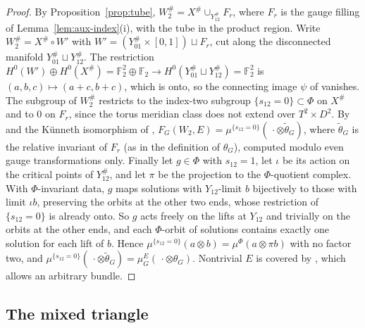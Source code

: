 \documentclass[11pt]{amsart}
\theoremstyle{definition}
\theoremstyle{remark}
\theoremstyle{plain}
\numberwithin{equation}{section}
\newcommand{\FF}{\mathbb{F}_2}
\begin{document}
\begin{proof}
By Proposition~\ref{prop:tube},
$W_2^\#=X^\#\cup_{Y_{12}^\#}F_r$, where $F_r$ is the gauge filling of
Lemma~\ref{lem:aux-index}(i), with the tube in the product region.
Write $W_2^\#=X^\#\circ W'$ with $W'=(Y_{01}^\#\times[0,1])\sqcup F_r$,
cut along the disconnected manifold $Y_{01}^\#\sqcup Y_{12}^\#$. The
restriction $H^0(W')\oplus H^0(X^\#)=\FF^2\oplus\FF\to H^0(Y_{01}^\#\sqcup
Y_{12}^\#)=\FF^2$ is $(a,b,c)\mapsto(a+c,b+c)$, which is onto, so the
connecting image $\psi$ of \cite[Proposition~5.4]{KM-unknot} vanishes.
The subgroup of $W_2^\#$ restricts to the index-two subgroup
$\{s_{12}=0\}\subset\Phi$ on $X^\#$ and to $0$ on $F_r$, since the
torus meridian class does not extend over $T^2\times D^2$. By
\cite[Proposition~5.4]{KM-unknot} and the K\"unneth isomorphism of
\cite[Section~5.2]{KM-unknot},
$F_G(W_2,E)=\mu^{\{s_{12}=0\}}(\,\cdot\otimes\tilde\theta_G)$, where
$\tilde\theta_G$ is the relative invariant of $F_r$ (as in the definition of $\theta_G$),
computed modulo even gauge transformations only. Finally let
$g\in\Phi$ with $s_{12}=1$, let $\iota$ be its action on the critical points of $Y_{12}^\#$, and
let $\pi$ be the projection to the $\Phi$-quotient complex. With $\Phi$-invariant data, $g$ maps
solutions with $Y_{12}$-limit $b$ bijectively to those with limit $\iota b$,
preserving the orbits at the other two ends, whose restriction of
$\{s_{12}=0\}$ is already onto. So $g$ acts freely on the lifts at $Y_{12}$ and trivially on the
orbits at the other ends, and each $\Phi$-orbit of solutions contains exactly one solution for
each lift of $b$. Hence
$\mu^{\{s_{12}=0\}}(a\otimes b)=\mu^\Phi(a\otimes\pi b)$ with no factor
two, and $\mu^{\{s_{12}=0\}}(\,\cdot\otimes\tilde\theta_G)=\mu_G^E(\,\cdot
\otimes\theta_G)$. Nontrivial $E$ is covered by
\cite[Section~5.1]{KM-unknot}, which allows an arbitrary bundle.
\end{proof}

\subsection{The mixed triangle}\label{subsec:mixed-triangle}
\end{document}
